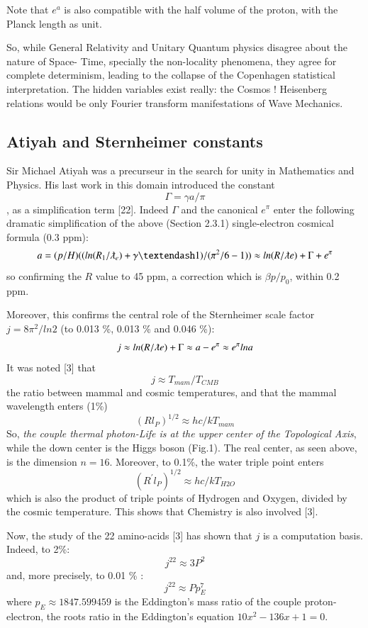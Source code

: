 \documentclass[twoside,draft]{article}
\begin{document}
\begin{sloppypar}
{Note that $e^{a}$ is also compatible with the half volume of the proton, with
the Planck length as unit.

So, while General Relativity and Unitary Quantum physics disagree about the nature of Space-
Time, specially the non-locality phenomena, they agree for complete determinism, leading to the collapse of the
Copenhagen statistical interpretation. The hidden variables exist really: the Cosmos ! Heisenberg
relations would be only Fourier transform manifestations of Wave Mechanics.


\subsection{Atiyah and Sternheimer constants}
    Sir Michael Atiyah was a precurseur in the search for unity in Mathematics and Physics. His last work in this domain introduced the constant $$\Gamma = \gamma a /\pi$$, as a simplification term [22]. Indeed $\Gamma$ and the canonical $e^{\pi}$ enter the following dramatic simplification of the above (Section 2.3.1) single-electron cosmical formula (0.3 ppm):    
\begin{equation}
a = (p/H)((ln(R_1/\lambdabar_e) + \gamma – 1)/(\pi^2/6 - 1)) \approx ln(R/\lambdabar e) + \Gamma + e^{\pi}
\end{equation}
so confirming the $R$ value to 45 ppm, a correction which is $\beta p/p_0$, within 0.2 ppm.

Moreover, this confirms the central role of the Sternheimer scale factor $j = 8\pi^2/ln2$ (to 0.013 \%, 0.013 \% and 0.046 \%):
\begin{equation}
j \approx ln(R/\lambdabar e) + \Gamma \approx a - e^{\pi} \approx e^{\pi} lna
\end{equation}
It was noted [3] that $$j\approx T_{mam}/T_{CMB}$$ the ratio between mammal and cosmic temperatures, and that the mammal wavelength enters (1\%) $$(Rl_P)^{1/2}\approx hc/kT_{mam}$$ So, \textit{the couple thermal photon-Life is at the upper center of the Topological Axis}, while the down center is the Higgs boson (Fig.1). The real center, as seen above, is the dimension $n = 16$. Moreover, to 0.1\%, the water triple point enters $$(R^{\prime}l_P)^{1/2}\approx hc/kT_{H2O}$$ which is also the product of triple points of Hydrogen and Oxygen, divided by the cosmic temperature. This shows that Chemistry is also involved [3].

Now, the study of the 22 amino-acids [3] has shown that $j$ is a computation basis. Indeed, to 2\%: $$j^{22} \approx 3 P^2 $$ and, more precisely, to 0.01 \% :$$j^{22} \approx Pp_E^7 $$ where $ p_E \approx 1847.599459$ is the Eddington's mass ratio of the couple proton-electron, the roots ratio in the Eddington's equation $10x^2 - 136x + 1 = 0 $.

}
\end{sloppypar}
\end{document}
